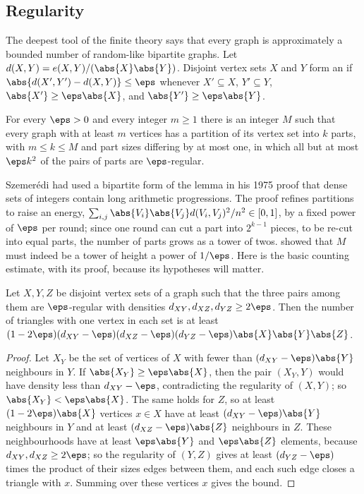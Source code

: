 \begin{refsection}
\subsection{Regularity}

The deepest tool of the finite theory says that every graph is approximately a bounded number of random-like bipartite graphs. Let $d(X,Y)=e(X,Y)/(\abs{X}\abs{Y})$. Disjoint vertex sets $X$ and $Y$ form an  if $\abs{d(X',Y')-d(X,Y)}\le\eps$ whenever $X'\subseteq X$, $Y'\subseteq Y$, $\abs{X'}\ge\eps\abs{X}$, and $\abs{Y'}\ge\eps\abs{Y}$.

\begin{theorem}\label{thm:graphon:szemeredi}
For every $\eps>0$ and every integer $m\ge1$ there is an integer $M$ such that every graph with at least $m$ vertices has a partition of its vertex set into $k$ parts, with $m\le k\le M$ and part sizes differing by at most one, in which all but at most $\eps k^2$ of the pairs of parts are $\eps$-regular.
\end{theorem}

Szemer\'edi had used a bipartite form of the lemma in his 1975 proof that dense sets of integers contain long arithmetic progressions. The proof refines partitions to raise an energy, $\sum_{i,j}\abs{V_i}\abs{V_j}d(V_i,V_j)^2/n^2\in[0,1]$, by a fixed power of $\eps$ per round; since one round can cut a part into $2^{k-1}$ pieces, to be re-cut into equal parts, the number of parts grows as a tower of twos. \textcite{Gowers1997} showed that $M$ must indeed be a tower of height a power of $1/\eps$. Here is the basic counting estimate, with its proof, because its hypotheses will matter.

\begin{lemma}\label{lem:graphon:count-classical}
Let $X,Y,Z$ be disjoint vertex sets of a graph such that the three pairs among them are $\eps$-regular with densities $d_{XY},d_{XZ},d_{YZ}\ge2\eps$. Then the number of triangles with one vertex in each set is at least $(1-2\eps)(d_{XY}-\eps)(d_{XZ}-\eps)(d_{YZ}-\eps)\abs{X}\abs{Y}\abs{Z}$.
\end{lemma}

\begin{proof}
Let $X_Y$ be the set of vertices of $X$ with fewer than $(d_{XY}-\eps)\abs{Y}$ neighbours in $Y$. If $\abs{X_Y}\ge\eps\abs{X}$, then the pair $(X_Y,Y)$ would have density less than $d_{XY}-\eps$, contradicting the regularity of $(X,Y)$; so $\abs{X_Y}<\eps\abs{X}$. The same holds for $Z$, so at least $(1-2\eps)\abs{X}$ vertices $x\in X$ have at least $(d_{XY}-\eps)\abs{Y}$ neighbours in $Y$ and at least $(d_{XZ}-\eps)\abs{Z}$ neighbours in $Z$. These neighbourhoods have at least $\eps\abs{Y}$ and $\eps\abs{Z}$ elements, because $d_{XY},d_{XZ}\ge2\eps$; so the regularity of $(Y,Z)$ gives at least $(d_{YZ}-\eps)$ times the product of their sizes edges between them, and each such edge closes a triangle with $x$. Summing over these vertices $x$ gives the bound.
\end{proof}


\end{refsection}
